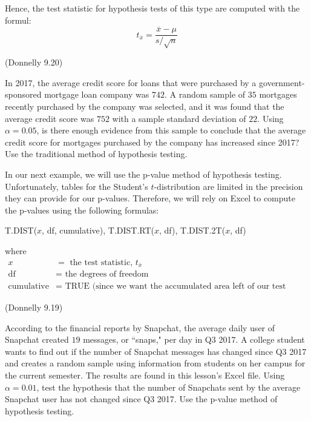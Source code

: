\documentclass[12pt, letterpaper]{article}
\newcounter{exercise}
\theoremstyle{definition}
\begin{document}
\vspace*{.1in}

\noindent Hence, the test statistic for hypothesis tests of this type are computed with the formul:
$$ t_{\overline{x}} = \frac{\overline{x}-\mu }{s/\sqrt{n}} $$


\begin{exercise}  (Donnelly 9.20)

In 2017, the average credit score for loans that were purchased by a government-sponsored mortgage loan company was $742$.  A random sample of $35$ mortgages recently purchased by the company was selected, and it was found that the average credit score was $752$ with a sample standard deviation of $22$.  Using $\alpha = 0.05$, is there enough evidence from this sample to conclude that the average credit score for mortgages purchased by the company has increased since 2017?  Use the traditional method of hypothesis testing.

\end{exercise}

\vfill

\newpage

\noindent In our next example, we will use the p-value method of hypothesis testing.  Unfortunately, tables for the Student's $t$-distribution are limited in the precision they can provide for our p-values.  Therefore, we will rely on Excel to compute the p-values using the following formulas:
\begin{center}
T.DIST($x$, df, cumulative), T.DIST.RT($x$, df), T.DIST.2T($x$, df)
\end{center}
where
\begin{align*}
x &= \text{ the test statistic, } t_{\overline{x}}\\
\text{df} &= \text{ the degrees of freedom}\\
\text{cumulative} &= \text{ TRUE (since we want the accumulated area left of our test statistic)}
\end{align*}


\begin{exercise}  (Donnelly 9.19)

According to the financial reports by Snapchat, the average daily user of Snapchat created $19$ messages, or ``snaps," per day in Q3 2017.  A college student wants to find out if the number of Snapchat messages has changed since Q3 2017 and creates a random sample using information from students on her campus for the current semester.  The results are found in this lesson's Excel file.  Using $\alpha = 0.01$, test the hypothesis that the number of Snapchats sent by the average Snapchat user has not changed since Q3 2017.  Use the p-value method of hypothesis testing.

\end{exercise}
\end{document}
